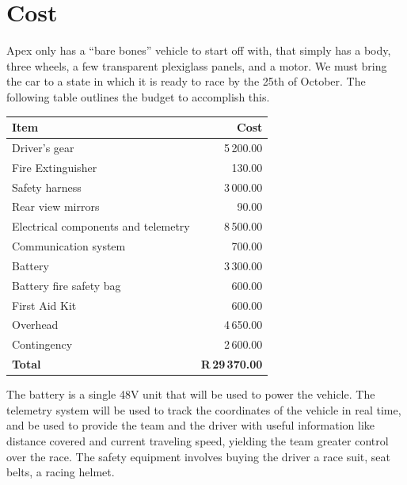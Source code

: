 \documentclass[a4paper, 12pt]{article}
\begin{document}
	\section{Cost} %
	\label{sec:cost}
		Apex only has a ``bare bones'' vehicle to start off with, that simply has a body, three wheels, a few transparent plexiglass panels, and a motor. We must bring the car to a state in which it is ready to race by the 25th of October. The following table outlines the budget to accomplish this.

		\begin{table}[H]
			\begin{tabularx}{\textwidth}{Xr}
				\toprule
				\textbf{Item} & \textbf{Cost} \\
				\midrule
				Driver's gear & 5\,200.00 \\
				Fire Extinguisher & 130.00 \\
				Safety harness & 3\,000.00 \\
				Rear view mirrors & 90.00 \\
				\addlinespace[0.7em]
				Electrical components and telemetry & 8\,500.00 \\
				Communication system & 700.00 \\
				Battery & 3\,300.00 \\
				Battery fire safety bag & 600.00 \\
				\addlinespace[0.7em]
				First Aid Kit & 600.00 \\
				Overhead & 4\,650.00 \\
				Contingency & 2\,600.00 \\
				\addlinespace[0.3em]
				\midrule
				\textbf{Total} & \textbf{R\,29\,370.00}\\
				\bottomrule
			\end{tabularx}
		\end{table}

		The battery is a single 48V unit that will be used to power the vehicle. The telemetry system will be used to track the coordinates of the vehicle in real time, and be used to provide the team and the driver with useful information like distance covered and current traveling speed, yielding the team greater control over the race. The safety equipment involves buying the driver a race suit, seat belts, a racing helmet.
\end{document}
